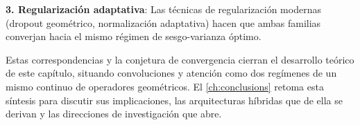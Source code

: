 \textbf{3. Regularización adaptativa}: Las técnicas de regularización modernas (dropout geométrico, normalización adaptativa) hacen que ambas familias converjan hacia el mismo régimen de sesgo-varianza óptimo.

Estas correspondencias y la conjetura de convergencia cierran el desarrollo teórico de este capítulo, situando convoluciones y atención como dos regímenes de un mismo continuo de operadores geométricos. El \autoref{ch:conclusions} retoma esta síntesis para discutir sus implicaciones, las arquitecturas híbridas que de ella se derivan y las direcciones de investigación que abre.
